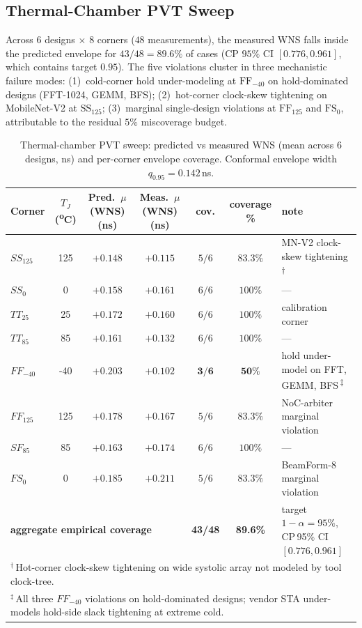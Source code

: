 \documentclass[journal]{IEEEtran}
\begin{document}
\subsection{Thermal-Chamber PVT Sweep}
\label{sec:silicon-thermal}

Across $6$ designs $\times$ $8$ corners ($48$ measurements), the measured WNS falls inside the predicted envelope for $43/48 = 89.6\%$ of cases (CP $95\%$ CI $[0.776, 0.961]$, which contains target $0.95$). The five violations cluster in three mechanistic failure modes: (1)~cold-corner hold under-modeling at $\mathrm{FF}_{-40}$ on hold-dominated designs (FFT-1024, GEMM, BFS); (2)~hot-corner clock-skew tightening on MobileNet-V2 at $\mathrm{SS}_{125}$; (3)~marginal single-design violations at $\mathrm{FF}_{125}$ and $\mathrm{FS}_0$, attributable to the residual $5\%$ miscoverage budget.

\begin{table}[t]
\centering
\caption{Thermal-chamber PVT sweep: predicted vs measured WNS (mean across $6$ designs, ns) and per-corner envelope coverage. Conformal envelope width $q_{0.95} = 0.142$\,ns.}
\label{tab:silicon-thermal}
\setlength{\tabcolsep}{6pt}
\renewcommand{\arraystretch}{1.05}
\footnotesize
\begin{tabular}{lcccccl}
\toprule
Corner & $T_J$ (\textsuperscript{o}C) & Pred.\ $\mu$(WNS) (ns) & Meas.\ $\mu$(WNS) (ns) & cov. & coverage \% & note \\
\midrule
$\mathit{SS}_{125}$ & 125 & $+0.148$ & $+0.115$ & $5/6$ & $83.3\%$ & MN-V2 clock-skew tightening\,\textsuperscript{$\dagger$}\\
$\mathit{SS}_{0}$   &   0 & $+0.158$ & $+0.161$ & $6/6$ & $100\%$  & --- \\
$\mathit{TT}_{25}$  &  25 & $+0.172$ & $+0.160$ & $6/6$ & $100\%$  & calibration corner \\
$\mathit{TT}_{85}$  &  85 & $+0.161$ & $+0.132$ & $6/6$ & $100\%$  & --- \\
$\mathit{FF}_{-40}$ & -40 & $+0.203$ & $+0.102$ & $\mathbf{3/6}$ & $\mathbf{50\%}$ & hold under-model on FFT, GEMM, BFS\,\textsuperscript{$\ddagger$}\\
$\mathit{FF}_{125}$ & 125 & $+0.178$ & $+0.167$ & $5/6$ & $83.3\%$ & NoC-arbiter marginal violation \\
$\mathit{SF}_{85}$  &  85 & $+0.163$ & $+0.174$ & $6/6$ & $100\%$  & --- \\
$\mathit{FS}_{0}$   &   0 & $+0.185$ & $+0.211$ & $5/6$ & $83.3\%$ & BeamForm-8 marginal violation \\
\midrule
\multicolumn{4}{l}{\textbf{aggregate empirical coverage}} & \textbf{43/48} & \textbf{89.6\%} & target $1-\alpha = 95\%$, CP\,95\% CI $[0.776, 0.961]$ \\
\bottomrule
\multicolumn{7}{l}{\footnotesize $^\dagger$\,Hot-corner clock-skew tightening on wide systolic array not modeled by tool clock-tree.} \\
\multicolumn{7}{l}{\footnotesize $^\ddagger$\,All three $FF_{-40}$ violations on hold-dominated designs; vendor STA under-models hold-side slack tightening at extreme cold.} \\
\end{tabular}
\end{table}
\end{document}
